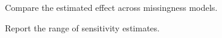 \documentclass[aspectratio=169,11pt]{beamer}
\begin{document}
\begin{frame}
Compare the estimated effect across missingness models.

Report the range of sensitivity estimates.
\end{frame}
\end{document}
